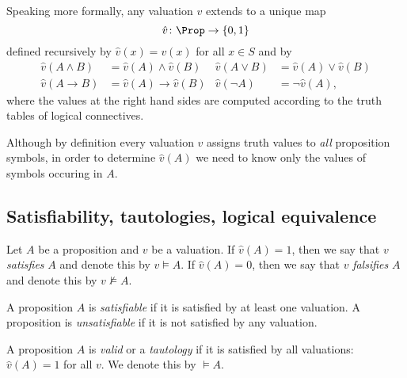 \begin{page}
\setcounter{section}{1}
\setcounter{subsection}{3}
\setcounter{dfn}{3}
\label{portion:415}


Speaking more formally, any valuation $v$ extends to a unique map
\[
\hat{v} \colon \Prop \to \{0,1\}
\]
defined recursively by $\hat{v}(x) = v(x)$ for all $x \in S$ and by
\begin{align*}
\hat{v}(A \wedge B) &= \hat{v}(A) \wedge \hat{v}(B) & \hat{v}(A \vee B) &= \hat{v}(A) \vee \hat{v}(B)\\
\hat{v}(A \to B) &= \hat{v}(A) \to \hat{v}(B) & \hat{v}(\neg A) &= \neg \hat{v}(A),
\end{align*}
where the values at the right hand sides are computed according to the truth tables of logical connectives.

Although by definition every valuation $v$ assigns truth values to \emph{all} proposition symbols,
in order to determine $\hat{v}(A)$ we need to know only the values of symbols occuring in $A$.



\end{page}

\begin{page}
\setcounter{section}{1}
\setcounter{subsection}{3}
\setcounter{dfn}{3}
\label{portion:417}

\subsection{Satisfiability, tautologies, logical equivalence}

\end{page}

\begin{page}
\setcounter{section}{1}
\setcounter{subsection}{3}
\setcounter{dfn}{4}
\label{portion:419}

\begin{dfn}
Let $A$ be a proposition and $v$ be a valuation.
If $\hat{v}(A) = 1$, then we say that $v$ \emph{satisfies} $A$ and denote this by $v \vDash A$.
If $\hat{v}(A) = 0$, then we say that $v$ \emph{falsifies} $A$ and denote this by $v \nvDash A$.
\end{dfn}

\end{page}

\begin{page}
\setcounter{section}{1}
\setcounter{subsection}{3}
\setcounter{dfn}{5}
\label{portion:422}

\begin{dfn}
A proposition $A$ is \emph{satisfiable} if it is satisfied by at least one valuation.
A proposition is \emph{unsatisfiable} if it is not satisfied by any valuation.

A proposition $A$ is \emph{valid} or a \emph{tautology} if it is satisfied by all valuations: $\hat{v}(A) = 1$ for all $v$.
We denote this by $\vDash A$.
\end{dfn}

\end{page}

